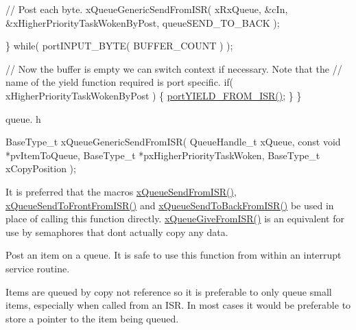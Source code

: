 \begin{DoxyPre}     // Post each byte.
     xQueueGenericSendFromISR( xRxQueue, &cIn, &xHigherPriorityTaskWokenByPost, queueSEND\_TO\_BACK );\end{DoxyPre}



\begin{DoxyPre} \} while( portINPUT\_BYTE( BUFFER\_COUNT ) );\end{DoxyPre}



\begin{DoxyPre} // Now the buffer is empty we can switch context if necessary.  Note that the
 // name of the yield function required is port specific.
 if( xHigherPriorityTaskWokenByPost )
 \{
     \hyperlink{externals_2freertos_2portable_2_g_c_c_2_a_r_m___c_m0_2portmacro_8h_aac6850c66595efdc02a8bbb95fb4648e}{portYIELD\_FROM\_ISR()};
 \}
\}
\end{DoxyPre}


queue. h 
\begin{DoxyPre}
BaseType\_t xQueueGenericSendFromISR(
                                       QueueHandle\_t        xQueue,
                                       const    void    *pvItemToQueue,
                                       BaseType\_t   *pxHigherPriorityTaskWoken,
                                       BaseType\_t   xCopyPosition
                                   );
\end{DoxyPre}


It is preferred that the macros \hyperlink{vendor_2ceedling_2plugins_2freertos_2src_2freertos_2include_2queue_8h_a21d5919ed26c21d121df4a4debeb643c}{x\+Queue\+Send\+From\+I\+S\+R()}, \hyperlink{vendor_2ceedling_2plugins_2freertos_2src_2freertos_2include_2queue_8h_af03b83396462affe9e28302660e7b9c6}{x\+Queue\+Send\+To\+Front\+From\+I\+S\+R()} and \hyperlink{vendor_2ceedling_2plugins_2freertos_2src_2freertos_2include_2queue_8h_a51e9f73417b11441a181cdc4f33a68e9}{x\+Queue\+Send\+To\+Back\+From\+I\+S\+R()} be used in place of calling this function directly. \hyperlink{externals_2freertos_2include_2queue_8h_ad14ae1174c2772cffc9e0c2c45dc55a6}{x\+Queue\+Give\+From\+I\+S\+R()} is an equivalent for use by semaphores that don\textquotesingle{}t actually copy any data.

Post an item on a queue. It is safe to use this function from within an interrupt service routine.

Items are queued by copy not reference so it is preferable to only queue small items, especially when called from an I\+SR. In most cases it would be preferable to store a pointer to the item being queued.


